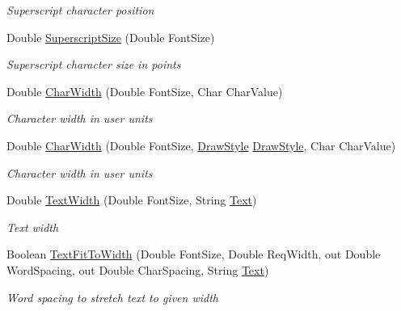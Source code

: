 \begin{DoxyCompactItemize}
\begin{DoxyCompactList}\small\item\em Superscript character position \end{DoxyCompactList}\item 
Double \hyperlink{class_pdf_file_writer_1_1_pdf_font_af7c8df60d692461858e2b90de73e88ad}{Superscript\+Size} (Double Font\+Size)
\begin{DoxyCompactList}\small\item\em Superscript character size in points \end{DoxyCompactList}\item 
Double \hyperlink{class_pdf_file_writer_1_1_pdf_font_aa07ef09d94d7fe56a2bedd01563bda6e}{Char\+Width} (Double Font\+Size, Char Char\+Value)
\begin{DoxyCompactList}\small\item\em Character width in user units \end{DoxyCompactList}\item 
Double \hyperlink{class_pdf_file_writer_1_1_pdf_font_a50ee7b84946de24bfb235a7bfdc71948}{Char\+Width} (Double Font\+Size, \hyperlink{namespace_pdf_file_writer_a2bcdd73c6cedab15d6f6c2a64333ef39}{Draw\+Style} \hyperlink{namespace_pdf_file_writer_a2bcdd73c6cedab15d6f6c2a64333ef39}{Draw\+Style}, Char Char\+Value)
\begin{DoxyCompactList}\small\item\em Character width in user units \end{DoxyCompactList}\item 
Double \hyperlink{class_pdf_file_writer_1_1_pdf_font_af56f95e8f4078c867e9b125c6fd1fa91}{Text\+Width} (Double Font\+Size, String \hyperlink{namespace_pdf_file_writer_a45e52c090a4d8e1333577773ec0bac4aa9dffbf69ffba8bc38bc4e01abf4b1675}{Text})
\begin{DoxyCompactList}\small\item\em Text width \end{DoxyCompactList}\item 
Boolean \hyperlink{class_pdf_file_writer_1_1_pdf_font_ad0eccad4fdb6d01e6e009d5dc68830b4}{Text\+Fit\+To\+Width} (Double Font\+Size, Double Req\+Width, out Double Word\+Spacing, out Double Char\+Spacing, String \hyperlink{namespace_pdf_file_writer_a45e52c090a4d8e1333577773ec0bac4aa9dffbf69ffba8bc38bc4e01abf4b1675}{Text})
\begin{DoxyCompactList}\small\item\em Word spacing to stretch text to given width \end{DoxyCompactList}\item 

\end{DoxyCompactItemize}
